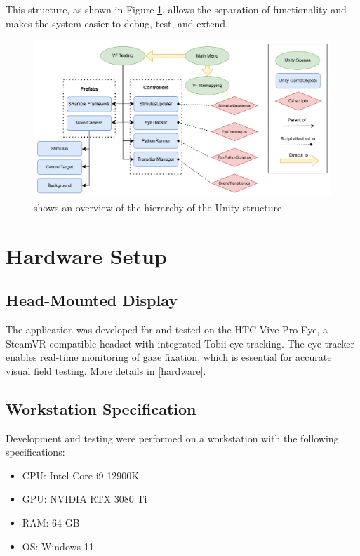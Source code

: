 \documentclass{l4proj}
\begin{document}
This structure, as shown in Figure \ref{fig:unityheir}, allows the separation of functionality and makes the system easier to debug, test, and extend. 

\begin{figure}[!h]
    \centering
    \includegraphics[width=1\linewidth]{images/Unity Heirarchy.png}
    \caption{shows an overview of the hierarchy of the Unity structure}
    \label{fig:unityheir}
\end{figure}

\section{Hardware Setup}

\subsection{Head-Mounted Display}
The application was developed for and tested on the HTC Vive Pro Eye, a SteamVR-compatible headset with integrated Tobii eye-tracking. The eye tracker enables real-time monitoring of gaze fixation, which is essential for accurate visual field testing. More details in \ref{hardware}.

\subsection{Workstation Specification}
Development and testing were performed on a workstation with the following specifications:

\begin{itemize}
    \item CPU: Intel Core i9-12900K
    
    \item GPU: NVIDIA RTX 3080 Ti

    \item RAM: 64 GB

    \item OS: Windows 11
\end{itemize}
\end{document}
